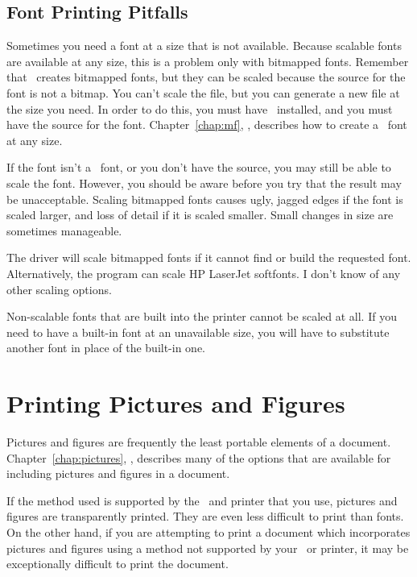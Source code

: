 \subsection{Font Printing Pitfalls}

Sometimes you need a font at a size that is not available.  Because scalable
fonts are available at any size, this is a problem only with
bitmapped fonts.  Remember 
that \MF\ creates bitmapped fonts, but they
can be scaled because the  source for the font is not
a bitmap.  You can't scale the  file, but you can generate a new
 file at the size you need.  In order to do this, you must
have \MF\ installed, and you must have the  source for the font.
Chapter~\ref{chap:mf}, {\it {}}, describes how to create a 
\MF\ font at any size.

If the font isn't a \MF\ font, or you don't have the  source,
you may still be able to scale the font.  However, you should be aware
before you try that the result may be unacceptable.  Scaling bitmapped fonts
causes ugly, jagged edges if the font is scaled larger, and loss of
detail if it is scaled smaller.  Small changes in size are sometimes
manageable.

The  driver will scale bitmapped fonts if it cannot
find or build the requested font.  Alternatively, the 
program can scale HP LaserJet softfonts.  I don't know of any other
scaling options.

Non-scalable fonts that are built into the printer cannot be
scaled at all.  If you need to have a built-in font at an unavailable
size, you will have to substitute another font in place of the built-in
one.

\section{Printing Pictures and Figures}

Pictures and 
figures are 
frequently the least portable elements of a document.
Chapter~\ref{chap:pictures}, {\it {}}, describes many of
the options that are available for including pictures and figures in a 
document.  

If the method used is supported by the \dvidriver\  and
printer that you use, pictures and figures are transparently printed.
They are even less difficult to print than fonts.
On the other hand, if you are attempting to print a document which
incorporates pictures and figures using a method not supported by your
\dvidriver\ or printer, it may be exceptionally difficult to print
the document.

